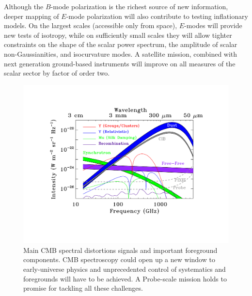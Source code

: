 Although the $B$-mode polarization is the richest source of new information, deeper mapping of $E$-mode polarization will also contribute to testing inflationary models. On the largest scales (accessible only from space), $E$-modes will provide new tests of isotropy, while on sufficiently small scales they will allow tighter constraints on the shape of the scalar power spectrum, the amplitude of scalar non-Gaussianities, and isocurvature modes. A satellite mission, combined with next generation ground-based instruments will improve on all measures of the scalar sector by factor of order two.


\begin{figure}[ht!]
\hspace{-0.2in}
\parbox{4.5in}{\centerline {
\includegraphics[width=4.5in]{Figures/probe_spectral_foregrounds_v2.pdf} } }
\hspace{-0.05in}
\parbox{2.0in}{
\caption{ \small \setlength{\baselineskip}{0.95\baselineskip}
Main CMB spectral distortions signals and important foreground components. CMB spectroscopy could open up a new window to early-universe physics and unprecedented control of systematics and foregrounds will have to be achieved. A Probe-scale mission holds to promise for tackling all these challenges.
\label{fig:distortions} } }
\vspace{-0.1in}
\end{figure}
